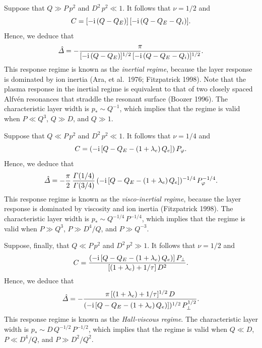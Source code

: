 \documentclass[notitlepage,12pt]{article}
\begin{document}
Suppose that $Q\gg P\,p^2$ and $D^2\,p^2 \ll 1$. It follows that $\nu=1/2$ and
\begin{equation}
C = [-{\rm i}\,(Q-Q_E)]\,[-{\rm i}\,(Q-Q_E-Q_i)].
\end{equation}
Hence, we deduce that
\begin{equation}
\hat{\mit\Delta} = -\frac{\pi}{[-{\rm i}\,(Q-Q_E)]^{1/2}\,[-{\rm i}\,(Q-Q_E-Q_i)]^{1/2}}.
\end{equation}
This response regime is known as the {\em inertial regime}, because the layer response is dominated by
 ion inertia (Ara, et al.\ 1976; Fitzpatrick 1998). Note that the plasma response in the inertial regime is
 equivalent to that of two closely spaced Alfv\'{e}n resonances that straddle the resonant surface (Boozer 1996). 
 The characteristic layer width is $p_\ast \sim Q^{-1}$,
which implies that the regime is valid when $P\ll Q^3$, $Q\gg D$, and $Q\gg 1$. 

Suppose that $Q\ll P\,p^2$ and $D^2\,p^2 \ll 1$. It follows that $\nu=1/4$ and
\begin{equation}
C = (-{\rm i}\,[Q-Q_E-(1+\lambda_e)\,Q_e])\,P_\varphi.
\end{equation}
Hence, we deduce that
\begin{equation}
\hat{\mit\Delta} =- \frac{\pi}{2}\,\frac{{\mit\Gamma}(1/4)}{{\mit\Gamma}(3/4)}\, (-{\rm i}\,[Q-Q_E-(1+\lambda_e)\,Q_e])^{-1/4}\,P_\varphi^{-1/4}.
\end{equation}
This response regime is known as the {\em visco-inertial regime}, because the layer response is dominated by
viscosity and ion inertia (Fitzpatrick 1998). 
 The characteristic layer width is $p_\ast \sim Q^{-1/4}\,P^{-1/4}$,
which implies that the regime is valid when $P\gg Q^3$, $P\gg D^4/Q$, and $P\gg Q^{-3}$. 

Suppose, finally, that $Q\ll P\,p^2$ and $D^2\,p^2\gg 1$. It follows that $\nu=1/2$ and
\begin{equation}
C = \frac{(-{\rm i}\,[Q-Q_E-(1+\lambda_e)\,Q_e)]\,P_\perp}{[(1+\lambda_e)+1/\tau]\,D^2}.
\end{equation}
Hence, we deduce that
\begin{equation}
\hat{\mit\Delta}= -\frac{\pi\,[(1+\lambda_e)+1/\tau]^{1/2}\,D}{(-{\rm i}\,[Q-Q_E-(1+\lambda_e)\,Q_e)])^{1/2}\,P_\perp^{1/2}}.
\end{equation}
This response regime is known as the {\em Hall-viscous regime}. The characteristic layer width is $p_\ast\sim
D\,Q^{-1/2}\,P^{-1/2}$, which implies that the regime is valid when $Q\ll D$, $P\ll D^4/Q$, and $P\gg D^2/Q^2$. 
\end{document}
